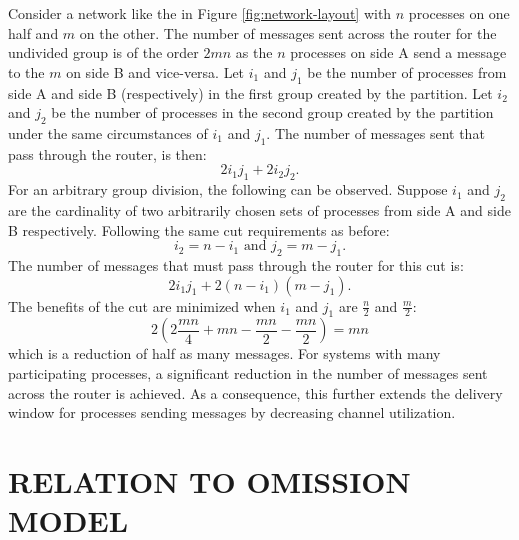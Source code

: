 Consider a network like the in Figure \ref{fig:network-layout} with $n$ processes on one half and $m$ on the other.
The number of messages sent across the router for the undivided group is of the order $2mn$ as the $n$ processes on side A send a message to the $m$ on side B and vice-versa.
Let $i_{1}$ and $j_{1}$ be the number of processes from side A and side B (respectively) in the first group created by the partition.
Let $i_{2}$ and $j_{2}$ be the number of processes in the second group created by the partition under the same circumstances of $i_1$ and $j_1$.
The number of messages sent that pass through the router, is then: 
\begin{equation}
2 i_{1} j_{1} + 2 i_{2} j_{2}.
\end{equation}
For an arbitrary group division, the following can be observed.
Suppose $i_{1}$ and $j_{2}$ are the cardinality of two arbitrarily chosen sets of processes from side A and side B respectively.
Following the same cut requirements as before:
\begin{equation}
i_2 = n - i_1 \text{ and } j_2 = m - j_1.
\end{equation}
The number of messages that must pass through the router for this cut is:
\begin{equation}
2 i_{1} j_{1} + 2 (n-i_{1}) (m-j_{1}).
\end{equation}
The benefits of the cut are minimized when $i_1$ and $j_1$ are $\frac{n}{2}$ and $\frac{m}{2}$:
\begin{equation}
2( 2 \frac{mn}{4} + mn - \frac{mn}{2} - \frac{mn}{2}) = mn
\end{equation}%
which is a reduction of half as many messages.
For systems with many participating processes, a significant reduction in the number of messages sent across the router is achieved.
As a consequence, this further extends the delivery window for processes sending messages by decreasing channel utilization.

\section{RELATION TO OMISSION MODEL}

